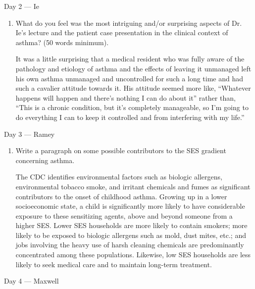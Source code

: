 \documentclass[11pt,final] {article}
\begin{document}
\clearpage

\begin{center}
	Day 2 --- Ie
\end{center}

\begin{enumerate}
	\item What do you feel was the most intriguing and/or surprising aspects of Dr. Ie’s lecture and the patient case presentation in the clinical context of asthma? (50 words minimum).
	
	It was a little surprising that a medical resident who was fully aware of the pathology and etiology of asthma and the effects of leaving it unmanaged left his own asthma unmanaged and uncontrolled for such a long time and had such a cavalier attitude towards it. His attitude seemed more like, ``Whatever happens will happen and there's nothing I can do about it'' rather than, ``This is a chronic condition, but it's completely manageable, so I'm going to do everything I can to keep it controlled and from interfering with my life.''
	
\end{enumerate}

\clearpage

\begin{center}
	Day 3 --- Ramey
\end{center}

\begin{enumerate}
	\item Write a paragraph on some possible contributors to the SES gradient concerning asthma.
	
	The CDC identifies environmental factors such as biologic allergens, environmental tobacco smoke, and irritant chemicals and fumes as significant contributors to the onset of childhood asthma. Growing up in a lower socioeconomic state, a child is significantly more likely to have considerable exposure to these sensitizing agents, above and beyond someone from a higher SES. Lower SES households are more likely to contain smokers; more likely to be exposed to biologic allergens such as mold, dust mites, etc.; and jobs involving the heavy use of harsh cleaning chemicals are predominantly concentrated among these populations. Likewise, low SES households are less likely to seek medical care and to maintain long-term treatment.
\end{enumerate}

\clearpage

\begin{center}
	Day 4 --- Maxwell
\end{center}
\end{document}
